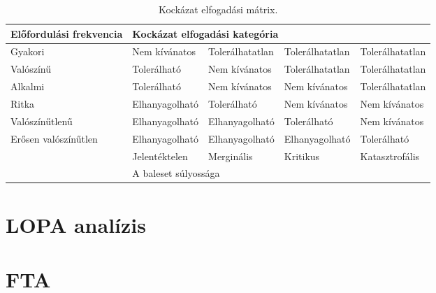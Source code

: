 \begin{table}
    \centering
    \begin{tabular}{|l|l|l|l|l|} 
        \hline
        Előfordulási frekvencia & \multicolumn{4}{l|}{Kockázat elfogadási kategória}                    \\ 
        \hline
        Gyakori                 & Nem kívánatos  & Tolerálhatatlan & Tolerálhatatlan & Tolerálhatatlan  \\ 
        \hline
        Valószínű               & Tolerálható    & Nem kívánatos   & Tolerálhatatlan & Tolerálhatatlan  \\ 
        \hline
        Alkalmi                 & Tolerálható    & Nem kívánatos   & Nem kívánatos   & Tolerálhatatlan  \\ 
        \hline
        Ritka                   & Elhanyagolható & Tolerálható     & Nem kívánatos   & Nem kívánatos    \\ 
        \hline
        Valószínűtlenű          & Elhanyagolható & Elhanyagolható  & Tolerálható     & Nem kívánatos    \\ 
        \hline
        Erősen valószínűtlen    & Elhanyagolható & Elhanyagolható  & Elhanyagolható  & Tolerálható      \\ 
        \hline
        \multicolumn{1}{l|}{}   & Jelentéktelen  & Merginális      & Kritikus        & Katasztrofális   \\ 
        \cline{2-5}
        \multicolumn{1}{l|}{}   & \multicolumn{4}{l|}{A baleset súlyossága}                             \\
        \cline{2-5}
        \end{tabular}
    \caption{Kockázat elfogadási mátrix.}
    \label{tab:risk_mat}
\end{table}



\section{LOPA analízis}

\section{FTA}